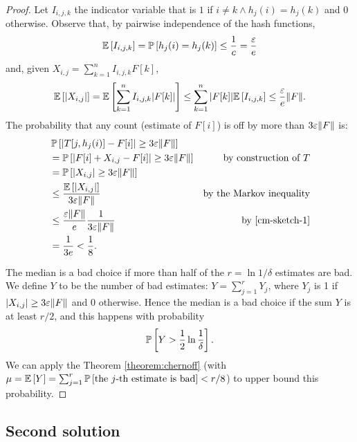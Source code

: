 \begin{proof}
  Let $I_{i,j,k}$ the indicator variable that is $1$ if $i \ne k \wedge h_j(i)=h_j(k)$ and $0$ otherwise. Observe that, by pairwise independence of the hash functions,
  $$\mathbb{E}\left[{I_{i,j,k}}\right] = \operatorname*{\mathbb{P}}\left[{h_j(i)=h_j(k)}\right] \leq \frac{1}{c} = \frac{\varepsilon}{e} $$
  and, given $X_{i,j}=\sum_{k=1}^n I_{i,j,k}F[k]$,
  \begin{equation}
    \label{cm-sketch-1}
  	\mathbb{E}\left[{|X_{i,j}|}\right] = \mathbb{E}\left[{\sum_{k=1}^n I_{i,j,k}|F[k]|}\right] \leq \sum_{k=1}^n |F[k]|\mathbb{E}\left[{I_{i,j,k}}\right] \leq \frac{\varepsilon}{e}\lVert F\rVert.
  \end{equation}
  The probability that any count (estimate of $F[i]$) is off by more than $3\varepsilon\lVert F\rVert$ is:
  \begin{align*}
    &  \operatorname*{\mathbb{P}}\left[{|T[j, h_j(i)]-F[i]| \geq 3\varepsilon\lVert F\rVert}\right] &  \\
    &= \operatorname*{\mathbb{P}}\left[{|F[i]+X_{i,j}-F[i]| \geq 3\varepsilon\lVert F\rVert}\right] & \text{by construction of $T$} \\
    &= \operatorname*{\mathbb{P}}\left[{|X_{i,j}| \geq 3\varepsilon\lVert F\rVert}\right] & \\
    &\leq \frac{\mathbb{E}\left[{|X_{i,j}|}\right]}{3\varepsilon\lVert F\rVert} & \text{by the Markov inequality} \\
    &\leq \frac{\varepsilon\lVert F\rVert}{e} \frac{1}{3\varepsilon\lVert F\rVert} & \text{by \eqref{cm-sketch-1}} \\
    &= \frac{1}{3e} < \frac{1}{8}. &
  \end{align*}
  
  The median is a bad choice if more than half of the $r = \ln 1/\delta$ estimates are bad. We define $Y$ to be the number of bad estimates: $Y = \sum_{j=1}^r Y_j$, where $Y_j$ is 1 if $|X_{i,j}| \geq 3\varepsilon\lVert F\rVert$ and 0 otherwise. Hence the median is a bad choice if the sum $Y$ is at least $r/2$, and this happens with probability
  $$\operatorname*{\mathbb{P}}\left[{Y > \frac{1}{2}\ln\frac{1}{\delta}}\right].$$
  We can apply the Theorem \ref{theorem:chernoff} (with $\mu = \mathbb{E}\left[{Y}\right] = \sum_{j=1}^r \operatorname*{\mathbb{P}}\left[{\text{the } j \text{-th estimate is bad}}\right] < r/8$) to upper bound this probability. 
\end{proof}

\subsection{Second solution}

